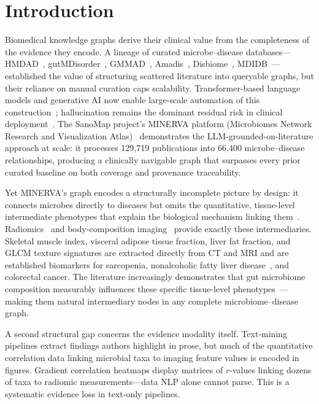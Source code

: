 \documentclass[10pt,twocolumn,letterpaper]{article}
\begin{document}
\section{Introduction}

Biomedical knowledge graphs derive their clinical value from the
completeness of the evidence they encode. A lineage of curated
microbe--disease databases---HMDAD~\cite{ma2016hmdad},
gutMDisorder~\cite{qi2022gutmdisorder}, GMMAD~\cite{wang2023gmmad},
Amadis~\cite{li2021amadis}, Disbiome~\cite{janssens2018disbiome},
MDIDB~\cite{wu2021mdidb}---established the value of structuring scattered
literature into queryable graphs, but their reliance on manual curation
caps scalability. Transformer-based language models and generative AI now
enable large-scale automation of this construction~\cite{devlin2019bert,beltagy2019scibert,karkera2023microbe,wenhao2022markergenie};
hallucination remains the dominant residual risk in clinical
deployment~\cite{aurangzeb2023hallucinations}. The SanoMap project's
MINERVA platform (Microbiomes Network Research and Visualization
Atlas)~\cite{langarica2025minerva} demonstrates the
LLM-grounded-on-literature approach at scale: it processes 129{,}719
publications into 66{,}400 microbe--disease relationships, producing a
clinically navigable graph that surpasses every prior curated baseline on
both coverage and provenance traceability.

Yet MINERVA's graph encodes a structurally incomplete picture by design: it
connects microbes directly to diseases but omits the quantitative,
tissue-level intermediate phenotypes that explain the biological mechanism
linking them~\cite{langarica2025minerva}.
Radiomics~\cite{lambin2012,aerts2014} and body-composition
imaging~\cite{cruzjentoft2019ewgsop2} provide exactly these intermediaries.
Skeletal muscle index, visceral adipose tissue fraction, liver fat fraction,
and GLCM texture signatures are extracted directly from CT and MRI and are
established biomarkers for sarcopenia, nonalcoholic fatty liver
disease~\cite{tilg2022gutliver}, and colorectal cancer. The literature
increasingly demonstrates that gut microbiome composition measurably
influences these specific tissue-level phenotypes~\cite{ticinesi2019gutmuscle,cani2008endotoxemia,botticelli2023qta}---making
them natural intermediary nodes in any complete microbiome--disease graph.

A second structural gap concerns the evidence modality itself. Text-mining
pipelines extract findings authors highlight in prose, but much of the
quantitative correlation data linking microbial taxa to imaging feature
values is encoded in figures. Gradient correlation heatmaps display matrices
of $r$-values linking dozens of taxa to radiomic measurements---data NLP
alone cannot parse. This is a systematic evidence loss in text-only
pipelines.
\end{document}
